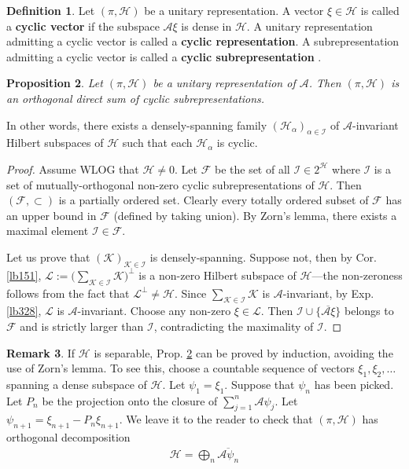 \documentclass[12pt,b5paper,notitlepage]{article}
\theoremstyle{definition}
\newtheorem{df}{Definition}[subsection]
\newtheorem{rem}[df]{Remark}
\theoremstyle{plain}
\newtheorem{pp}[df]{Proposition}
\newcommand{\mc}{\mathcal}
\newcommand{\ovl}{\overline}
\newcommand{\scr}{\mathscr}
\newcommand{\MH}{\mathcal H}
\newcommand{\MK}{\mathcal K}
\newcommand{\SI}{\mathscr I}
\newcommand{\SA}{\mathscr A}
\newcommand{\SF}{\mathscr F}
\numberwithin{equation}{section}
\begin{document}
\begin{df}
Let $(\pi,\MH)$ be a unitary representation. A vector $\xi\in \MH$ is called a \textbf{cyclic vector}  if the subspace $\scr A\xi$ is dense in $\MH$. A unitary representation admitting a cyclic vector is called a \textbf{cyclic representation}.  A subrepresentation admitting a cyclic vector is called a \textbf{cyclic subrepresentation} .
\end{df}


\begin{pp}\label{lb329}
Let $(\pi,\MH)$ be a unitary representation of $\SA$. Then $(\pi,\MH)$ is an orthogonal direct sum of cyclic subrepresentations. 
\end{pp}


In other words, there exists a densely-spanning family $(\MH_\alpha)_{\alpha\in\SI}$ of $\SA$-invariant Hilbert subspaces of $\MH$ such that each $\MH_\alpha$ is cyclic.

\begin{proof}
Assume WLOG that $\MH\neq0$. Let $\SF$ be the set of all $\SI\in 2^\MH$ where $\SI$ is a set of mutually-orthogonal non-zero cyclic subrepresentations of $\MH$. Then $(\SF,\subset)$ is a partially ordered set. Clearly every totally ordered subset of $\SF$ has an upper bound in $\SF$ (defined by taking union). By Zorn's lemma, there exists a maximal element $\SI\in\SF$. 

Let us prove that $(\MK)_{\MK\in\SI}$ is densely-spanning. Suppose not, then by Cor. \ref{lb151}, $\mc L:=\big(\sum_{\MK\in\SI}\MK\big)^\perp$ is a non-zero Hilbert subspace of $\MH$---the non-zeroness follows from the fact that $\mc L^\perp\neq\MH$. Since $\sum_{\MK\in\SI}\MK$ is $\SA$-invariant, by Exp. \ref{lb328}, $\mc L$ is $\SA$-invariant. Choose any non-zero $\xi\in\mc L$. Then $\SI\cup\{\ovl{\SA\xi}\}$ belongs to $\SF$ and is strictly larger than $\SI$, contradicting the maximality of $\SI$.
\end{proof}


\begin{rem}
If $\MH$ is separable, Prop. \ref{lb329} can be proved by induction, avoiding the use of Zorn’s lemma. To see this, choose a countable sequence of vectors $\xi_1,\xi_2,\dots$ spanning a dense subspace of $\MH$. Let $\psi_1=\xi_1$. Suppose that $\psi_n$ has been picked. Let $P_n$ be the projection onto the closure of $\sum_{j=1}^n\SA\psi_j$. Let $\psi_{n+1}=\xi_{n+1}-P_n\xi_{n+1}$. We leave it to the reader to check that $(\pi,\MH)$ has orthogonal decomposition
\begin{align*}
\MH=\bigoplus_n \ovl{\SA\psi_n}
\end{align*}
\end{rem}
\end{document}
